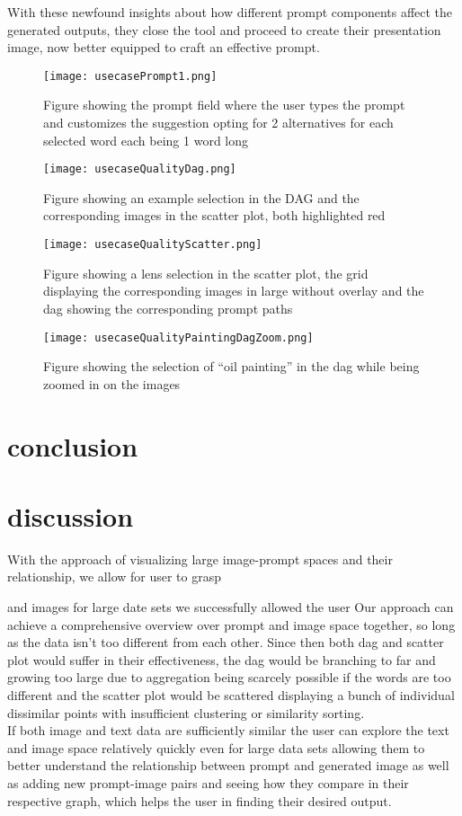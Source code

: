 \documentclass[
  a4paper,  %
  twoside,  %
  bibliography=totoc,
  headsepline,
  cleardoublepage=empty,
  parskip=half,
  draft=false
]{scrbook}
\begin{document}
 With these newfound insights about how different prompt components affect the generated outputs, they close the tool and proceed to create their presentation image, now better equipped to craft an effective prompt.
\begin{figure}[H]
	\centering
	\texttt{[image: usecasePrompt1.png]}
	\caption{Figure showing the prompt field where the user types the prompt and customizes the suggestion opting for 2 alternatives for each selected word each being 1 word long}
	\label{fig:usecasePrompt1}
\end{figure}
\begin{figure}[H]
		\centering
	\texttt{[image: usecaseQualityDag.png]}
	\caption{Figure showing an example selection in the DAG and the corresponding images in the scatter plot, both highlighted red}
	\label{fig:usecaseQualityDag}
\end{figure}
\begin{figure}[H]
	\centering
	\texttt{[image: usecaseQualityScatter.png]}
	\caption{Figure showing a lens selection in the scatter plot, the grid displaying the corresponding images in large without overlay and the dag showing the corresponding prompt paths}
	\label{fig:usecaseQualityScatter}
\end{figure}
\begin{figure}[H]
	\centering
	\texttt{[image: usecaseQualityPaintingDagZoom.png]}
	\caption{Figure showing the selection of \enquote{oil painting} in the dag while being zoomed in on the images}
	\label{fig:usecaseQualityPaintingDagZoom}
\end{figure}


\chapter{conclusion}
\chapter{discussion}
\label{chap:zusfas}
With the approach of visualizing large image-prompt spaces and their relationship, we allow for user to grasp 


and images for large date sets  we successfully allowed the user 
Our approach can achieve a comprehensive overview over prompt and image space together, so long as the data isn't too different from each other. Since then both dag and scatter plot would suffer in their effectiveness, the dag would be branching to far and growing too large due to aggregation being scarcely possible if the words are too different and the scatter plot would be scattered displaying a bunch of individual dissimilar points with insufficient clustering or similarity sorting.\\ If both image and text data are sufficiently similar the user can explore the text and image space relatively quickly even for large data sets allowing them to better understand the relationship between prompt and generated image as well as adding new prompt-image pairs and seeing how they compare in their respective graph, which helps the user in finding their desired output.
\end{document}
